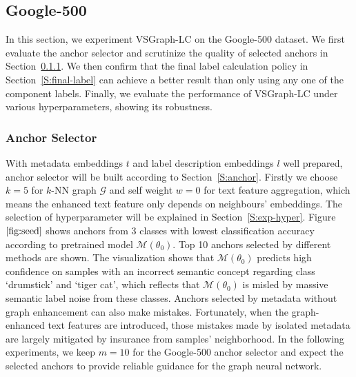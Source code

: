 \documentclass[sigconf]{acmart}
\begin{document}
\subsection{Google-500}
\label{sec:google-500}
In this section, we experiment VSGraph-LC on the Google-500 dataset. We first evaluate the anchor selector and scrutinize the quality of selected anchors in Section~\ref{S:exp-anchor}. We then confirm that the final label calculation policy in Section~\ref{S:final-label} can achieve a better result than only using any one of the component labels. Finally, we evaluate the performance of VSGraph-LC under various hyperparameters, showing its robustness.

\subsubsection{Anchor Selector}
\label{S:exp-anchor}
With metadata embeddings $t$ and label description embeddings $l$ well prepared, anchor selector will be built according to Section~\ref{S:anchor}. Firstly we choose $k=5$ for $k$-NN graph $\mathcal{G}$ and self weight $w=0$ for text feature aggregation, which means the enhanced text feature only depends on neighbours' embeddings. The selection of hyperparameter will be explained in Section~\ref{S:exp-hyper}.
Figure~$\ref{fig:seed}$ shows anchors from 3 classes with lowest classification accuracy according to pretrained model $\mathcal{M}(\theta_0)$. Top 10 anchors selected by different methods are shown. The visualization shows that $\mathcal{M}(\theta_0)$ predicts high confidence on samples with an incorrect semantic concept regarding class `drumstick' and `tiger cat', which reflects that $\mathcal{M}(\theta_0)$ is misled by massive semantic label noise from these classes. Anchors selected by metadata without graph enhancement can also make mistakes. Fortunately, when the graph-enhanced text features are introduced, those mistakes made by isolated metadata are largely mitigated by insurance from samples' neighborhood. 
In the following experiments, we keep $m=10$ for the Google-500 anchor selector and expect the selected anchors to provide reliable guidance for the graph neural network.
\end{document}
